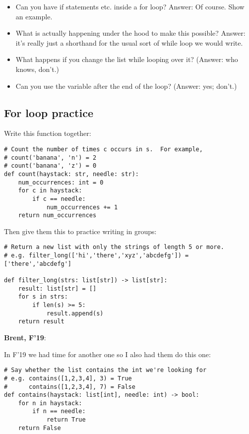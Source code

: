 \documentclass{article}
\newenvironment{reflect}[1]
{
  \noindent
  \begin{lrbox}{\reflectbox}
    \begin{minipage}[t]{\textwidth}
      \textbf{#1}:
}{
    \end{minipage}
  \end{lrbox}
  \fbox{\usebox{\reflectbox}}
}
\begin{document}
\begin{itemize}
\item Can you have if statements etc. inside a for loop?  Answer: Of
  course.  Show an example.
\item What is actually happening under the hood to make this possible?
  Answer: it's really just a shorthand for the usual sort of while
  loop we would write.
\item What happens if you change the list while looping over it?
  (Answer: who knows, don't.)
\item Can you use the variable after the end of the loop? (Answer:
  yes; don't.)
\end{itemize}

\subsection*{For loop practice}

Write this function together:
\begin{verbatim}
# Count the number of times c occurs in s.  For example,
# count('banana', 'n') = 2
# count('banana', 'z') = 0
def count(haystack: str, needle: str):
    num_occurrences: int = 0
    for c in haystack:
        if c == needle:
            num_occurrences += 1
    return num_occurrences
\end{verbatim}

Then give them this to practice writing in groups:
\begin{verbatim}
# Return a new list with only the strings of length 5 or more.
# e.g. filter_long(['hi','there','xyz','abcdefg']) = ['there','abcdefg']

def filter_long(strs: list[str]) -> list[str]:
    result: list[str] = []
    for s in strs:
        if len(s) >= 5:
            result.append(s)
    return result
\end{verbatim}

\begin{reflect}{Brent, F'19}
  In F'19 we had time for another one so I also had them do this one:
\end{reflect}

\begin{verbatim}
# Say whether the list contains the int we're looking for
# e.g. contains([1,2,3,4], 3) = True
#      contains([1,2,3,4], 7) = False
def contains(haystack: list[int], needle: int) -> bool:
    for n in haystack:
        if n == needle:
            return True
    return False
\end{verbatim}
\end{document}

